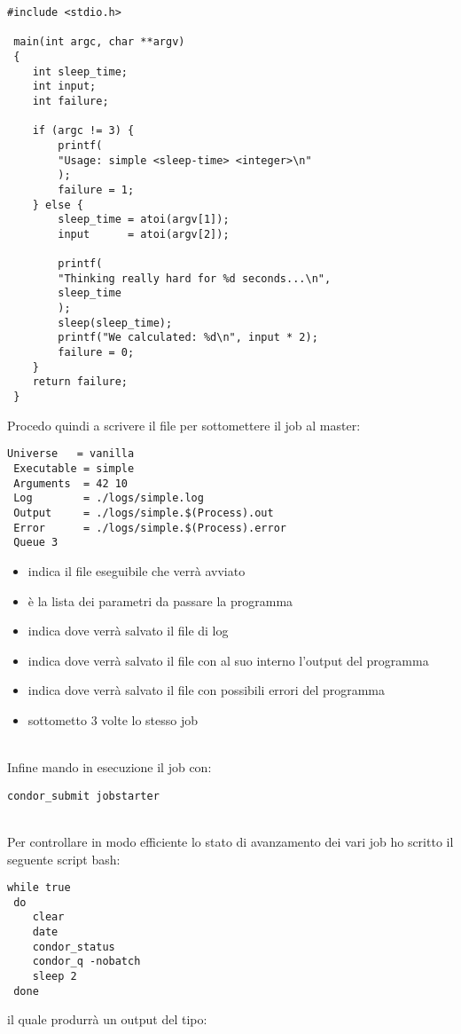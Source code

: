 \begin{lstlisting}[style=c]
 #include <stdio.h>
 
 main(int argc, char **argv)
 {
	int sleep_time;
	int input;
	int failure;
	
	if (argc != 3) {
		printf(
		"Usage: simple <sleep-time> <integer>\n"
		);
		failure = 1;
	} else {
		sleep_time = atoi(argv[1]);
		input      = atoi(argv[2]);
		
		printf(
		"Thinking really hard for %d seconds...\n",
		sleep_time
		);
		sleep(sleep_time);
		printf("We calculated: %d\n", input * 2);
		failure = 0;
	}
	return failure;
 }
\end{lstlisting}
\pagebreak
Procedo quindi a scrivere il file  per sottomettere il job al master: 

\begin{lstlisting}[style=cmd]
 Universe   = vanilla
 Executable = simple
 Arguments  = 42 10
 Log        = ./logs/simple.log
 Output     = ./logs/simple.$(Process).out
 Error      = ./logs/simple.$(Process).error
 Queue 3
\end{lstlisting}

\begin{itemize}
	\item {} indica il file eseguibile che verr\`{a} avviato
	\item {} \`{e} la lista dei parametri da passare la programma
	\item {} indica dove verr\`{a} salvato il file di log
	\item {} indica dove verr\`{a} salvato il file con al suo interno l'output del programma
	\item {} indica dove verr\`{a} salvato il file con possibili errori del programma
	\item {} sottometto 3 volte lo stesso job
\end{itemize}
\ \\
Infine mando in esecuzione il job con: 

\begin{lstlisting}[style=cmd]
 condor_submit jobstarter
\end{lstlisting}
\ \\
Per controllare in modo efficiente lo stato di avanzamento dei vari job ho scritto il seguente script bash:

\begin{lstlisting}[style=bash]
 while true
 do
    clear
    date
    condor_status
    condor_q -nobatch
    sleep 2
 done
\end{lstlisting}
\pagebreak
il quale produrr\`{a} un output del tipo:


